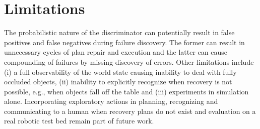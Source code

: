 \section{Limitations}
\label{sec:limitations}
The probabilistic nature of the discriminator can potentially result in  false positives and false negatives during failure discovery. The former can result in unnecessary cycles of plan repair and execution and the latter can cause compounding of failures by missing discovery of errors.  
%
Other limitations include (i) a full observability of the world state causing inability to deal with fully occluded objects, (ii) inability to explicitly recognize when recovery is not possible, e.g., when objects fall off the table and (iii) experiments in simulation alone.
%
Incorporating exploratory actions in planning, recognizing and communicating to a human when recovery plans do not exist and  evaluation on a real robotic test bed remain part of future work.